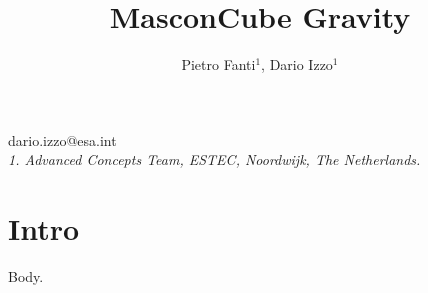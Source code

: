 \documentclass{aero}
\begin{document}
\title{MasconCube Gravity}
\author{Pietro Fanti$^{1}$, Dario Izzo$^{1}$\cor{}}
\maketitle
\noindent\cor{} dario.izzo@esa.int \\
\noindent\textit{1. Advanced Concepts Team, ESTEC, Noordwijk, The Netherlands.}
\section{Intro}
Body.
\end{document}
